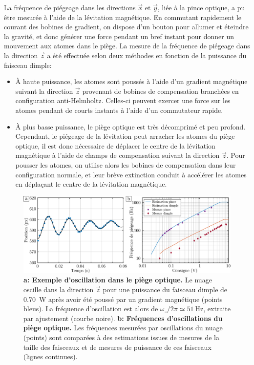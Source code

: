 La fréquence de piégeage dans les directions $\vec{x}$ et $\vec{y}$, liée à la pince optique, a pu être mesurée à l'aide de la lévitation magnétique. En commutant rapidement le courant des bobines de gradient, on dispose d'un bouton pour allumer et éteindre la gravité, et donc générer une force pendant un bref instant pour donner un mouvement aux atomes dans le piège. La mesure de la fréquence de piégeage dans la direction $\vec{z}$ a été effectuée selon deux méthodes en fonction de la puissance du faisceau dimple:
\begin{itemize}
\item[\textendash] À haute puissance, les atomes sont poussés à l'aide d'un gradient magnétique suivant la direction $\vec{z}$ provenant de bobines de compensation branchées en configuration anti-Helmholtz. Celles-ci peuvent exercer une force sur les atomes pendant de courts instants à l'aide d'un commutateur rapide.
\item[\textendash] À plus basse puissance, le piège optique est très décomprimé et peu profond. Cependant, le piégeage de la lévitation peut arracher les atomes du piège optique, il est donc nécessaire de déplacer le centre de la lévitation magnétique à l'aide de champs de compensation suivant la direction $\vec{z}$. Pour pousser les atomes, on utilise alors les bobines de compensation dans leur configuration normale, et leur brève extinction conduit à accélérer les atomes en déplaçant le centre de la lévitation magnétique.
\end{itemize}

\begin{figure}
\centering
\includegraphics[width=\textwidth]{Fig/Modif_exp/frequences_piege_optique.pdf}
\caption{\textbf{a: Exemple d'oscillation dans le piège optique.} Le nuage oscille dans la direction $\vec{z}$ pour une puissance du faisceau dimple de \SI{0.70}{\watt} après avoir été poussé par un gradient magnétique (points bleus). La fréquence d'oscillation est alors de $\omega_z /2\pi \simeq \SI{51}{\hertz}$, extraite par ajustement (courbe noire). \textbf{b: Fréquences d'oscillations du piège optique.} Les fréquences mesurées par oscillations du nuage (points) sont comparées à des estimations issues de mesures de la taille des faisceaux et de mesures de puissance de ces faisceaux (lignes continues).}
\label{fig:frequences_piege_optique}
\end{figure}


